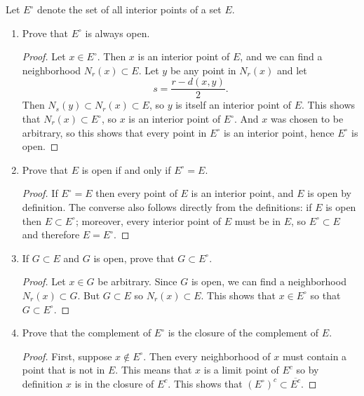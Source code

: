  Let $E^\circ$ denote the set of all interior points of a
set $E$.
\begin{enumerate}
\item Prove that $E^\circ$ is always open.
  \begin{proof}
    Let $x\in E^\circ$. Then $x$ is an interior point of $E$, and we
    can find a neighborhood $N_r(x)\subset E$. Let $y$ be any point in
    $N_r(x)$ and let
    \begin{equation*}
      s = \frac{r - d(x,y)}2.
    \end{equation*}
    Then $N_s(y)\subset N_r(x)\subset E$, so $y$ is itself an interior
    point of $E$. This shows that $N_r(x)\subset E^\circ$, so $x$ is
    an interior point of $E^\circ$. And $x$ was chosen to be
    arbitrary, so this shows that every point in $E^\circ$ is an
    interior point, hence $E^\circ$ is open.
  \end{proof}
\item Prove that $E$ is open if and only if $E^\circ = E$.
  \begin{proof}
    If $E^\circ = E$ then every point of $E$ is an interior point, and
    $E$ is open by definition. The converse also follows directly from
    the definitions: if $E$ is open then $E\subset E^\circ$; moreover,
    every interior point of $E$ must be in $E$, so $E^\circ\subset E$
    and therefore $E=E^\circ$.
  \end{proof}
\item If $G\subset E$ and $G$ is open, prove that $G\subset E^\circ$.
  \begin{proof}
    Let $x\in G$ be arbitrary. Since $G$ is open, we can find a
    neighborhood $N_r(x)\subset G$. But $G\subset E$ so
    $N_r(x)\subset E$. This shows that $x\in E^\circ$ so that
    $G\subset E^\circ$.
  \end{proof}
\item Prove that the complement of $E^\circ$ is the closure of the
  complement of $E$.
  \begin{proof}
    First, suppose $x\not\in E^\circ$. Then every neighborhood of $x$
    must contain a point that is not in $E$. This means that $x$ is a
    limit point of $E^c$ so by definition $x$ is in the closure of
    $E^c$. This shows that $(E^\circ)^c \subset \overline{E^c}$.


\end{proof}
\end{enumerate}
